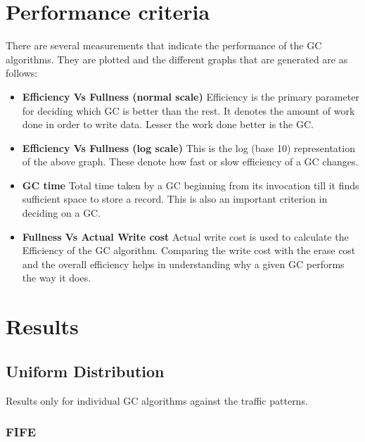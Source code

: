 \section{Performance criteria}
	There are several measurements that indicate the performance of the GC algorithms. They are plotted and the different graphs that are generated are as follows:
\begin{itemize}
\item {\bf Efficiency Vs Fullness (normal scale)}
\subitem Efficiency is the primary parameter for deciding which GC is better than the rest. It denotes the amount of work done in order to write data. Lesser the work done better is the GC.
\item {\bf Efficiency Vs Fullness (log scale)}
\subitem This is the log (base 10) representation of the above graph. These denote how fast or slow efficiency of a GC changes. 
\item {\bf GC time}
\subitem Total time taken by a GC beginning from its invocation till it finds sufficient space to store a record. This is also an important criterion in deciding on a GC.
\item {\bf Fullness Vs Actual Write cost}
\subitem Actual write cost is used to calculate the Efficiency of the GC algorithm. Comparing the write cost with the erase cost and the overall efficiency helps in understanding why a given GC performs the way it does.
\end{itemize}

\section{Results}

\subsection{Uniform Distribution}
	Results only for individual GC algorithms against the traffic patterns.

\subsubsection{FIFE}

